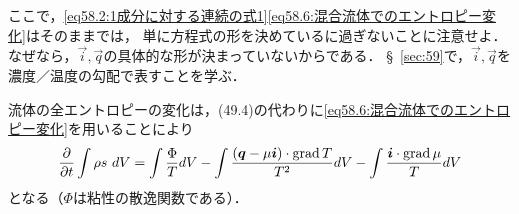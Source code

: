 ここで，\eqref{eq58.2:1成分に対する連続の式1}\eqref{eq58.6:混合流体でのエントロピー変化}はそのままでは，
単に方程式の形を決めているに過ぎないことに注意せよ．
なぜなら，$\vec{i},\vec{q}$の具体的な形が決まっていないからである．
\S~\ref{sec:59}で，$\vec{i},\vec{q}$を濃度／温度の勾配で表すことを学ぶ．



流体の全エントロピーの変化は，(49.4)の代わりに\eqref{eq58.6:混合流体でのエントロピー変化}を用いることにより
\begin{equation}\label{eq58.7:混合流体でのエントロピー変化（積分形）}
    \pdv{t} \int \rho s \,\, dV = \int \frac{\Phi}{T} dV
    - \int \frac{(\vb*{q}-\mu\vb*{i})\cdot\operatorname{grad} T}{T^2} dV - \int \frac{\vb*{i}\cdot\operatorname{grad}\mu}{T} dV 
\end{equation}
となる（$\Phi$は粘性の散逸関数である）．











\BackToTheToc